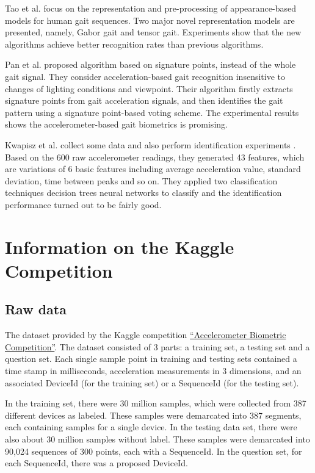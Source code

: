 \documentclass{article} %
\begin{document}
Tao et al.\cite{Tao:ToPAMI2007} focus on the representation and pre-processing of appearance-based models for human gait sequences. Two major novel representation models are presented, namely, Gabor gait and tensor gait. Experiments show that the new algorithms achieve better recognition rates than previous algorithms.

Pan et al. \cite{Pan:EL2009} proposed algorithm based on signature points, instead of the whole gait signal. They consider acceleration-based gait recognition insensitive to changes of lighting conditions and viewpoint. Their algorithm firstly extracts signature points from gait acceleration signals, and then identifies the gait pattern using a signature point-based voting scheme. The experimental results shows the accelerometer-based gait biometrics is promising. 

Kwapisz et al.\cite{Kwapisz:BTAS2009} collect some data and also perform identification experiments . Based on the 600 raw accelerometer readings, they generated 43 features, which are variations of 6 basic features including average acceleration value, standard deviation, time between peaks and so on. They applied two classification techniques decision trees neural networks to classify and the identification performance turned out to be fairly good.


\section{Information on the Kaggle Competition}
\subsection{Raw data}
The dataset provided by the Kaggle competition \href{http://www.kaggle.com/c/accelerometer-biometric-competition}{``Accelerometer Biometric Competition''}. The dataset consisted of 3 parts: a training set, a testing set and a question set. Each single sample point in training and testing sets contained a time stamp in milliseconds, acceleration measurements in 3 dimensions, and an associated DeviceId (for the training set) or a SequenceId (for the testing set). 

In the training set, there were 30 million samples, which were collected from 387 different devices as labeled. These samples were demarcated into 387 segments, each containing samples for a single device. In the testing data set, there were also about 30 million samples without label. These samples were demarcated into 90,024 sequences of 300 points, each with a SequenceId. In the question set, for each SequenceId, there was a proposed DeviceId.
\end{document}

